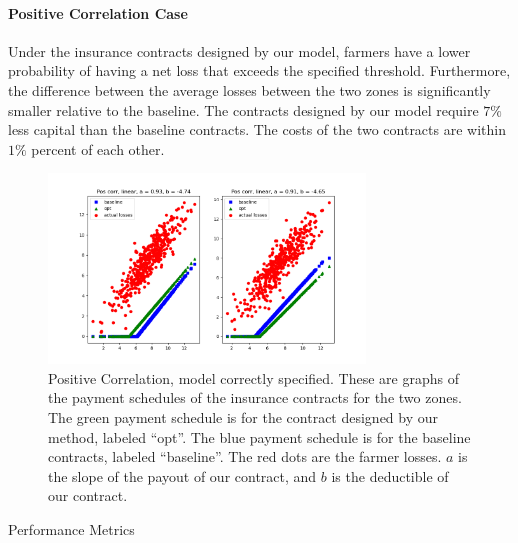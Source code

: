 \documentclass[11pt]{article}
\begin{document}
      \paragraph{Positive Correlation Case} Under the insurance contracts designed by our model, farmers have a lower probability of having a net loss that exceeds the specified threshold. Furthermore, the difference between the average losses between the two zones is significantly smaller relative to the baseline. The contracts designed by our model require $7\%$ less capital than the baseline contracts. The costs of the two contracts are within $1\%$ percent of each other. 
      \begin{figure}[H]
          \centering
          \includegraphics[width=0.75\textwidth]{../../output/figures/Exploration/pos_correlation_linear.png}
          \caption{Positive Correlation, model correctly specified. These are graphs of the payment schedules of the insurance contracts for the two zones. The green payment schedule is for the contract designed by our method, labeled ``opt''. The blue payment schedule is for the baseline contracts, labeled ``baseline''. The red dots are the farmer losses. $a$ is the slope of the payout of our contract, and $b$ is the deductible of our contract.}
      \end{figure}

      \begin{table}[H]
          \centering
          \small
          \caption{Performance Metrics}
          
      \end{table}
      \FloatBarrier
\end{document}
